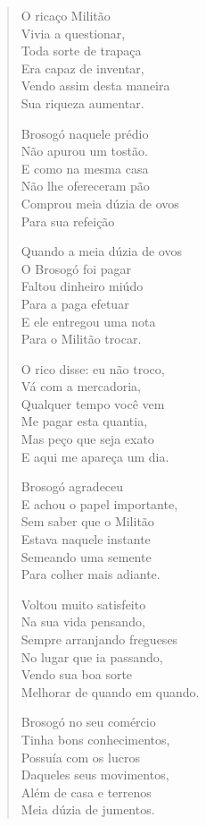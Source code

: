 \begin{verse}
O ricaço Militão\\
Vivia a questionar,\\
Toda sorte de trapaça\\
Era capaz de inventar,\\
Vendo assim desta maneira\\
Sua riqueza aumentar.

Brosogó naquele prédio\\
Não apurou um tostão.\\
E como na mesma casa\\
Não lhe ofereceram pão\\
Comprou meia dúzia de ovos\\
Para sua refeição

Quando a meia dúzia de ovos\\
O Brosogó foi pagar\\
Faltou dinheiro miúdo\\
Para a paga efetuar\\
E ele entregou uma nota\\
Para o Militão trocar.

O rico disse: eu não troco,\\
Vá com a mercadoria,\\
Qualquer tempo você vem\\
Me pagar esta quantia,\\
Mas peço que seja exato\\
E aqui me apareça um dia.

Brosogó agradeceu\\
E achou o papel importante,\\
Sem saber que o Militão\\
Estava naquele instante\\
Semeando uma semente\\
Para colher mais adiante.

Voltou muito satisfeito\\
Na sua vida pensando,\\
Sempre arranjando fregueses\\
No lugar que ia passando,\\
Vendo sua boa sorte\\
Melhorar de quando em quando.

Brosogó no seu comércio\\
Tinha bons conhecimentos,\\
Possuía com os lucros\\
Daqueles seus movimentos,\\
Além de casa e terrenos\\
Meia dúzia de jumentos.


\end{verse}
